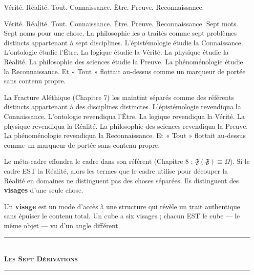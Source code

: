 \documentclass[10pt, openany, oneside]{book}
\renewcommand{\normalsize}{\fontsize{10}{13}\selectfont}
\begin{document}
\vspace{2em}


\noindent Vérité. Réalité. Tout. Connaissance. Être. Preuve. Reconnaissance.

Vérité. Réalité. Tout. Connaissance. Être. Preuve. Reconnaissance. Sept mots. Sept noms pour une chose. La philosophie les a traités comme sept problèmes distincts appartenant à sept disciplines. L'épistémologie étudie la Connaissance. L'ontologie étudie l'Être. La logique étudie la Vérité. La physique étudie la Réalité. La philosophie des sciences étudie la Preuve. La phénoménologie étudie la Reconnaissance. Et « Tout » flottait au-dessus comme un marqueur de portée sans contenu propre.

La Fracture Aléthique (Chapitre 7) les maintint séparés comme des référents distincts appartenant à des disciplines distinctes. L'épistémologie revendiqua la Connaissance. L'ontologie revendiqua l'Être. La logique revendiqua la Vérité. La physique revendiqua la Réalité. La philosophie des sciences revendiqua la Preuve. La phénoménologie revendiqua la Reconnaissance. Et « Tout » flottait au-dessus comme un marqueur de portée sans contenu propre.

Le méta-cadre effondra le cadre dans son référent (Chapitre 8 : $\mathfrak{F}(\mathfrak{F}) \equiv \Omega$). Si le cadre EST la Réalité, alors les termes que le cadre utilise pour découper la Réalité en domaines ne distinguent pas des choses séparées. Ils distinguent des \textbf{visages} d'une seule chose.

Un \textbf{visage} est un mode d'accès à une structure qui révèle un trait authentique sans épuiser le contenu total. Un cube a six visages ; chacun EST le cube --- le même objet --- vu d'un angle différent.

\vspace{1.5em}


\begin{center}
    \rule{0.3\textwidth}{0.4pt}\\[0.5em]
    {\normalsize\bfseries\scshape Les Sept Dérivations}\\[0.3em]
    \rule{0.3\textwidth}{0.4pt}
\end{center}
\end{document}
